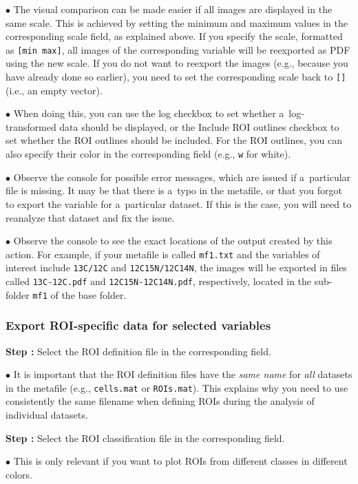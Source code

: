 \documentclass[a4paper, 11pt]{article}
\newcommand{\ttt}[1]{\texttt{#1}}
\newcommand{\lanscb}[1]{{\color{darkgreen}#1}}
\newcommand{\lanstf}[1]{{\color{cyan}#1}}
\newcounter{step}
\newcommand\s{\addtocounter{step}{1}\noindent\textbf{Step \thestep:}{ }}
\newcommand\bul{\noindent$\bullet${ }}
\begin{document}
\bul The visual comparison can be made easier if all images are displayed in the same scale. This is achieved by setting the minimum and maximum values in the corresponding \lanstf{scale} field, as explained above. If you specify the scale, formatted as \ttt{[min max]}, all images of the corresponding variable will be reexported as PDF using the new scale. If you do not want to reexport the images (e.g., because you have already done so earlier), you need to set the corresponding scale back to \ttt{[]} (i.e., an empty vector).

\bul When doing this, you can use the \lanscb{log} checkbox to set whether a~log-transformed data should be displayed, or the \lanscb{Include ROI outlines} checkbox to set whether the ROI outlines should be included. For the ROI outlines, you can also specify their \lanstf{color} in the corresponding field (e.g., \ttt{w} for white). 

\bul Observe the console for possible error messages, which are issued if a~particular file is missing. It may be that there is a~typo in the metafile, or that you forgot to export the variable for a~particular dataset. If this is the case, you will need to reanalyze that dataset and fix the issue.

\bul Observe the console to see the exact locations of the output created by this action. For example, if your metafile is called \ttt{mf1.txt} and the variables of interest include \ttt{13C/12C} and \ttt{12C15N/12C14N}, the images will be exported in files called \ttt{13C-12C.pdf} and \ttt{12C15N-12C14N.pdf}, respectively, located in the sub-folder \ttt{mf1} of the \lanstf{base folder}.

\subsubsection{Export ROI-specific data for selected variables}
\label{sec:622}
\setcounter{step}{0}

\s Select the \lanstf{ROI definition file} in the corresponding field.

\bul It is important that the ROI definition files have the \emph{same name} for \emph{all} datasets in the metafile (e.g., \ttt{cells.mat} or \ttt{ROIs.mat}). This explains why you need to use consistently the same filename when defining ROIs during the analysis of individual datasets.

\s Select the \lanstf{ROI classification file} in the corresponding field.

\bul This is only relevant if you want to plot ROIs from different classes in different colors.
\end{document}
